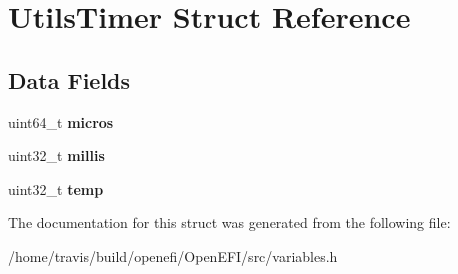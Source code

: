 \hypertarget{structUtilsTimer}{}\section{Utils\+Timer Struct Reference}
\label{structUtilsTimer}
\subsection*{Data Fields}
\begin{DoxyCompactItemize}
\item 
uint64\+\_\+t {\bfseries micros}\hypertarget{structUtilsTimer_a5cdccdeff0de6a795934c45e817cf149}{}\label{structUtilsTimer_a5cdccdeff0de6a795934c45e817cf149}

\item 
uint32\+\_\+t {\bfseries millis}\hypertarget{structUtilsTimer_ae325bf6a07bbd1d9cbe266d76278c3e3}{}\label{structUtilsTimer_ae325bf6a07bbd1d9cbe266d76278c3e3}

\item 
uint32\+\_\+t {\bfseries temp}\hypertarget{structUtilsTimer_abeb0419aca0c17b3b6f7af06126b091a}{}\label{structUtilsTimer_abeb0419aca0c17b3b6f7af06126b091a}

\end{DoxyCompactItemize}


The documentation for this struct was generated from the following file\+:\begin{DoxyCompactItemize}
\item 
/home/travis/build/openefi/\+Open\+E\+F\+I/src/variables.\+h\end{DoxyCompactItemize}
